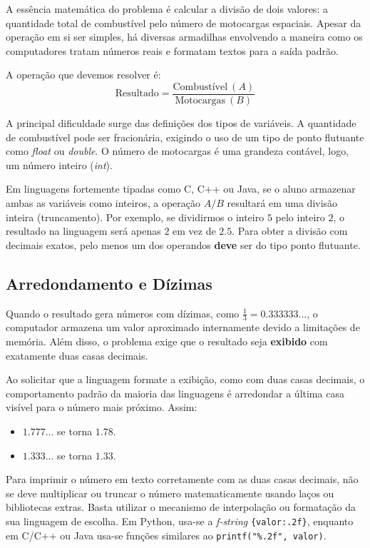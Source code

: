 \documentclass{article}
\begin{document}
A essência matemática do problema é calcular a divisão de dois valores: a quantidade total de combustível pelo número de motocargas espaciais. Apesar da operação em si ser simples, há diversas armadilhas envolvendo a maneira como os computadores tratam números reais e formatam textos para a saída padrão.

A operação que devemos resolver é:
\[
\text{Resultado} = \frac{\text{Combustível}\ (A)}{\text{Motocargas}\ (B)}
\]

A principal dificuldade surge das definições dos tipos de variáveis. A quantidade de combustível pode ser fracionária, exigindo o uso de um tipo de ponto flutuante como \textit{float} ou \textit{double}. O número de motocargas é uma grandeza contável, logo, um número inteiro (\textit{int}).

\begin{warnbox}
Em linguagens fortemente tipadas como C, C++ ou Java, se o aluno armazenar ambas as variáveis como inteiros, a operação $A / B$ resultará em uma divisão inteira (truncamento). Por exemplo, se dividirmos o inteiro $5$ pelo inteiro $2$, o resultado na linguagem será apenas $2$ em vez de $2.5$. Para obter a divisão com decimais exatos, pelo menos um dos operandos \textbf{deve} ser do tipo ponto flutuante.
\end{warnbox}

\subsection{Arredondamento e Dízimas}

Quando o resultado gera números com dízimas, como $\frac{1}{3} = 0.333333...$, o computador armazena um valor aproximado internamente devido a limitações de memória. Além disso, o problema exige que o resultado seja \textbf{exibido} com exatamente duas casas decimais.

Ao solicitar que a linguagem formate a exibição, como com duas casas decimais, o comportamento padrão da maioria das linguagens é arredondar a última casa visível para o número mais próximo. Assim:
\begin{itemize}
    \item $1.777...$ se torna $1.78$.
    \item $1.333...$ se torna $1.33$.
\end{itemize}

\begin{successbox}
Para imprimir o número em texto corretamente com as duas casas decimais, não se deve multiplicar ou truncar o número matematicamente usando laços ou bibliotecas extras. Basta utilizar o mecanismo de interpolação ou formatação da sua linguagem de escolha. Em Python, usa-se a \textit{f-string} \texttt{\{valor:.2f\}}, enquanto em C/C++ ou Java usa-se funções similares ao \texttt{printf("\%.2f", valor)}.
\end{successbox}
\end{document}

